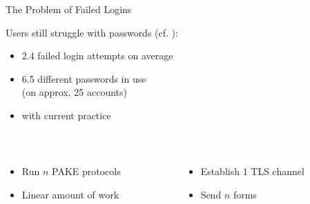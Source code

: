\documentclass[notes,xcolor=dvipsnames]{beamer}
\begin{document}
\begin{frame}{The Problem of Failed Logins}{}

	Users still struggle with passwords (cf. \cite{Florencio2007,Gaw2006a}):
	
	\begin{itemize}
		\item 2.4 failed login attempts on average
		\item 6.5 different passwords in use\\ (on approx. 25 accounts)
		\item {} with current practice
	\end{itemize}
	\pause\vspace*{1em}

	\begin{columns}[t]
    \begin{column}{.475\linewidth}
	    	{\centering{}}\\
	    	\begin{itemize}
	    		\setlength{\itemindent}{-1em}
	    		\item Run $n$ PAKE protocols
		    \item Linear amount of work
	    	\end{itemize}
    \end{column}
	\vspace*{2em}
    \begin{column}{.475\linewidth}
    		{\centering{}}\\
    		\begin{itemize}
	    		\setlength{\itemindent}{-1em}
	    		\item Establish 1 TLS channel
	    		\item Send $n$ forms
    		\end{itemize}
    \end{column}
  \end{columns}
\end{frame}
\end{document}
